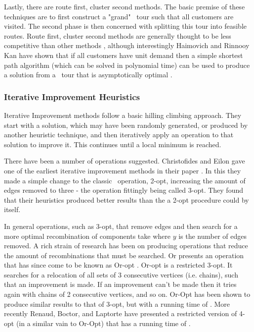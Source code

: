 Lastly, there are route first, cluster second methods. The basic premise of these techniques are to first construct a "grand" \TSP\ tour such that all customers are visited. The second phase is then concerned with splitting this tour into feasible routes. Route first, cluster second methods are generally thought to be less competitive than other methods \cite{Laporte:1999}, although interestingly Haimovich and Rinnooy Kan have shown that if all customers have unit demand then a simple shortest path algorithm (which can be solved in polynomial time) can be used to produce a solution from a \TSP\ tour that is asymptotically optimal \cite{HK:1985}.

\subsubsection{Iterative Improvement Heuristics}

Iterative Improvement methods follow a basic hilling climbing approach. They start with a solution, which may have been randomly generated, or produced by another heuristic technique, and then iteratively apply an operation to that solution to improve it. This continues until a local minimum is reached.

There have been a number of operations suggested. Christofides and Eilon gave one of the earliest iterative improvement methods in their paper \cite{CE:1969}. In this they made a simple change to the classic \TSP\ operation, 2-opt, increasing the amount of edges removed to three - the operation fittingly being called 3-opt. They found that their heuristics produced better results than the a 2-opt procedure could by itself. 

In general operations, such as 3-opt, that remove edges and then search for a more optimal recombination of components take  where $y$ is the number of edges removed. A rich strain of research has been on producing operations that reduce the amount of recombinations that must be searched. Or presents an operation that has since come to be known as Or-opt \cite{Or:1976}. Or-opt is a restricted 3-opt. It searches for a relocation of all sets of 3 consecutive vertices (i.e. chains), such that an improvement is made. If an improvement can't be made then it tries again with chains of 2 consecutive vertices, and so on. Or-Opt has been shown to produce similar results to that of 3-opt, but with a running time of . More recently Renaud, Boctor, and Laptorte have presented a restricted version of 4-opt (in a similar vain to Or-Opt) that has a running time of  \cite{RBL:1996}. 

